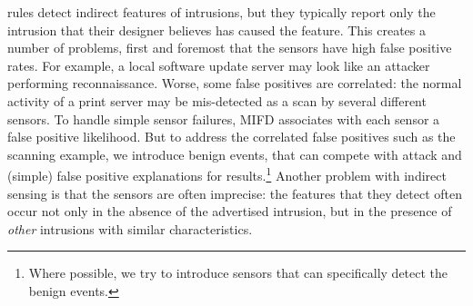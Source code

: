 \ids rules detect indirect features of intrusions, but they typically
report only the intrusion that their designer believes has caused the feature.
This creates a number of problems, first and foremost that the
sensors have high false positive rates.
For example, a local software update server
may look like an attacker performing reconnaissance.
Worse, some false positives are correlated: the normal
activity of a print server may be mis-detected as a scan by several
different sensors.
To handle simple sensor failures, MIFD associates with each sensor a false
positive likelihood.
But to address the correlated false positives such as the scanning example, we
introduce benign events, that can compete with attack and (simple) false
positive explanations for results.\footnote{Where possible, we try to introduce sensors that
can specifically detect the benign events. 
}
Another problem with indirect sensing is that the sensors are often imprecise:
the features that they detect often occur not only in the absence of the
advertised intrusion, but in the presence of \emph{other} intrusions with
similar characteristics.


